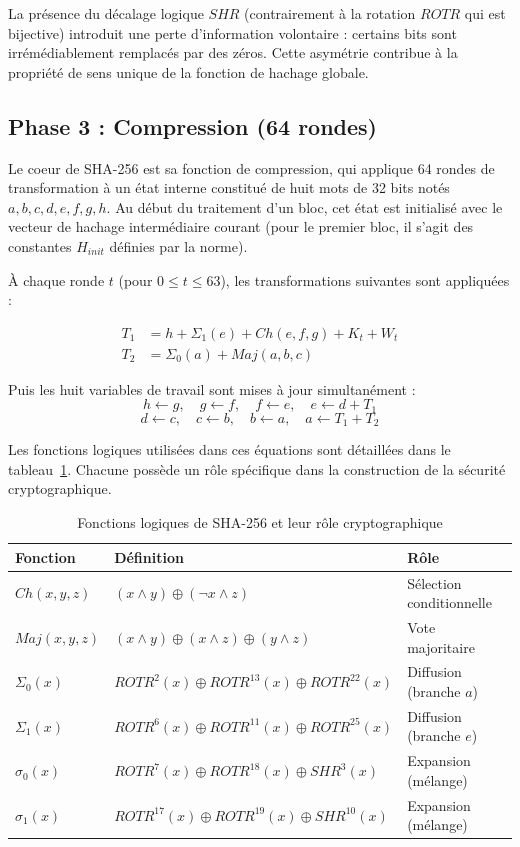 La présence du décalage logique $SHR$ (contrairement à la rotation $ROTR$ qui est bijective) introduit une perte d'information volontaire : certains bits sont irrémédiablement remplacés par des zéros. Cette asymétrie contribue à la propriété de sens unique de la fonction de hachage globale.

\subsection{Phase 3 : Compression (64 rondes)}

Le coeur de SHA-256 est sa fonction de compression, qui applique 64 rondes de transformation à un état interne constitué de huit mots de 32 bits notés $a, b, c, d, e, f, g, h$. Au début du traitement d'un bloc, cet état est initialisé avec le vecteur de hachage intermédiaire courant (pour le premier bloc, il s'agit des constantes $H_{init}$ définies par la norme).

À chaque ronde $t$ (pour $0 \leq t \leq 63$), les transformations suivantes sont appliquées :

\begin{align}
T_1 &= h + \Sigma_1(e) + Ch(e,f,g) + K_t + W_t \label{eq:t1}\\
T_2 &= \Sigma_0(a) + Maj(a,b,c) \label{eq:t2}
\end{align}

Puis les huit variables de travail sont mises à jour simultanément :
\[
h \leftarrow g, \quad g \leftarrow f, \quad f \leftarrow e, \quad e \leftarrow d + T_1
\]
\[
d \leftarrow c, \quad c \leftarrow b, \quad b \leftarrow a, \quad a \leftarrow T_1 + T_2
\]

Les fonctions logiques utilisées dans ces équations sont détaillées dans le tableau~\ref{tab:fonctions}. Chacune possède un rôle spécifique dans la construction de la sécurité cryptographique.

\begin{table}[H]
\centering
\caption{Fonctions logiques de SHA-256 et leur rôle cryptographique}
\label{tab:fonctions}
\begin{tabular}{lll}
\toprule
\textbf{Fonction} & \textbf{Définition} & \textbf{Rôle} \\
\midrule
$Ch(x,y,z)$   & $(x \wedge y) \oplus (\neg x \wedge z)$ & Sélection conditionnelle \\
$Maj(x,y,z)$  & $(x \wedge y) \oplus (x \wedge z) \oplus (y \wedge z)$ & Vote majoritaire \\
$\Sigma_0(x)$ & $ROTR^{2}(x) \oplus ROTR^{13}(x) \oplus ROTR^{22}(x)$ & Diffusion (branche $a$) \\
$\Sigma_1(x)$ & $ROTR^{6}(x) \oplus ROTR^{11}(x) \oplus ROTR^{25}(x)$ & Diffusion (branche $e$) \\
$\sigma_0(x)$ & $ROTR^{7}(x) \oplus ROTR^{18}(x) \oplus SHR^{3}(x)$ & Expansion (mélange) \\
$\sigma_1(x)$ & $ROTR^{17}(x) \oplus ROTR^{19}(x) \oplus SHR^{10}(x)$ & Expansion (mélange) \\
\bottomrule
\end{tabular}
\end{table}

